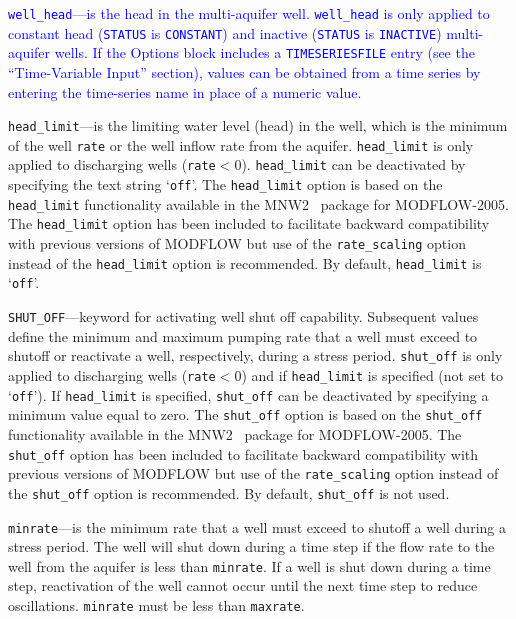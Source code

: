 \item \textcolor{blue}{\texttt{well\_head}---is the head in the multi-aquifer well. \texttt{well\_head} is only applied to constant head (\texttt{STATUS} is \texttt{CONSTANT}) and inactive (\texttt{STATUS} is \texttt{INACTIVE}) multi-aquifer wells. If the Options block includes a \texttt{TIMESERIESFILE} entry (see the ``Time-Variable Input'' section), values can be obtained from a time series by entering the time-series name in place of a numeric value.}

\item \texttt{head\_limit}---is the limiting water level (head) in the well, which is the minimum of the well \texttt{rate} or the well inflow rate from the aquifer. \texttt{head\_limit} is only applied to discharging wells (\texttt{rate}$<0$). \texttt{head\_limit} can be deactivated by specifying the text string `\texttt{off}'. The \texttt{head\_limit} option is based on the \texttt{head\_limit} functionality available in the MNW2~\citep{konikow2009} package for MODFLOW-2005. The \texttt{head\_limit} option has been included to facilitate backward compatibility with previous versions of MODFLOW but use of the \texttt{rate\_scaling} option instead of the \texttt{head\_limit} option is recommended. By default, \texttt{head\_limit} is `\texttt{off}'.

\item \texttt{SHUT\_OFF}---keyword for activating well shut off capability.  Subsequent values define the minimum and maximum pumping rate that a well must exceed to shutoff or reactivate a well, respectively, during a stress period. \texttt{shut\_off} is only applied to discharging wells (\texttt{rate}$<0$) and if \texttt{head\_limit} is specified (not set to `\texttt{off}').  If \texttt{head\_limit} is specified, \texttt{shut\_off} can be deactivated by specifying a minimum value equal to zero. The \texttt{shut\_off} option is based on the \texttt{shut\_off} functionality available in the MNW2~\citep{konikow2009} package for MODFLOW-2005. The \texttt{shut\_off} option has been included to facilitate backward compatibility with previous versions of MODFLOW but use of the \texttt{rate\_scaling} option instead of the \texttt{shut\_off} option is recommended. By default, \texttt{shut\_off} is not used.

\item \texttt{minrate}---is the minimum rate that a well must exceed to shutoff a well during a stress period. The well will shut down during a time step if the flow rate to the well from the aquifer is less than \texttt{minrate}. If a well is shut down during a time step, reactivation of the well cannot occur until the next time step to reduce oscillations. \texttt{minrate} must be less than \texttt{maxrate}.

